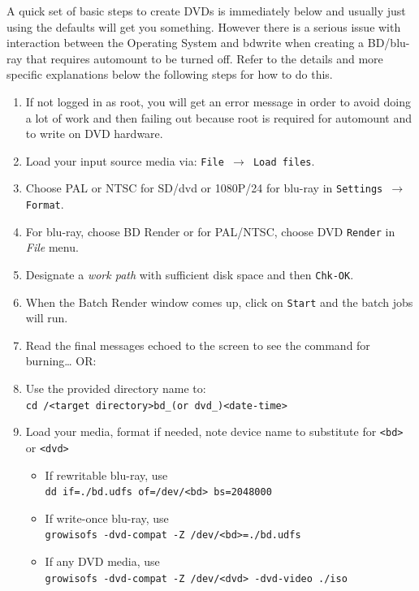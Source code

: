 A quick set of basic steps to create DVDs is immediately below and usually just using the defaults will get you something.  However there is a serious issue with interaction between the Operating System and bdwrite when creating a BD/blu-ray that requires automount to be turned off.  Refer to the details and more specific explanations below the following steps for how to do this.

\begin{enumerate}
    \item If not logged in as root, you will get an error message in order to avoid doing a lot of work and then failing out because root is required for automount and to write on DVD hardware.
    \item Load your input source media via: \texttt{File $\rightarrow$ Load files}.
    \item Choose PAL or NTSC for SD/dvd or 1080P/24 for blu-ray in \texttt{Settings $\rightarrow$ Format}.
    \item For blu-ray, choose BD Render or for PAL/NTSC, choose DVD \texttt{Render} in  \textit{File} menu.
    \item Designate a \textit{work path} with sufficient disk space and then \texttt{Chk-OK}.
    \item When the Batch Render window comes up, click on \texttt{Start} and the batch jobs will run.
    \item Read the final messages echoed to the screen to see the command for burning… OR:
    \item Use the provided directory name to:\\ 
    \texttt{cd /<target directory>bd\_(or dvd\_)<date-time>}
    \item Load your media, format if needed, note device name to substitute for \texttt{<bd>} or \texttt{<dvd>}
    \begin{itemize}
        \item If rewritable blu-ray, use \\
        \texttt{dd if=./bd.udfs of=/dev/<bd> bs=2048000}
        \item If write-once blu-ray, use \\
        \texttt{growisofs -dvd-compat -Z /dev/<bd>=./bd.udfs}
        \item If any DVD media,    use \\
        \texttt{growisofs -dvd-compat -Z /dev/<dvd> -dvd-video ./iso}
    \end{itemize}
\end{enumerate}

